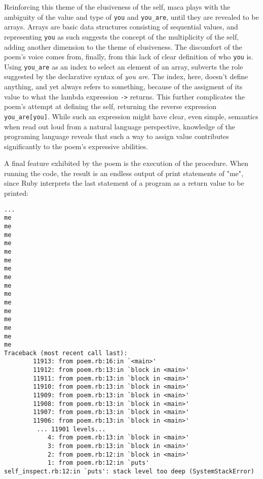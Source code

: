 \documentclass{article}
\begin{document}
Reinforcing this theme of the elusiveness of the self, maca plays with the ambiguity of the value and type of \lstinline{you} and \lstinline{you_are}, until they are revealed to be arrays. Arrays are basic data structures consisting of sequential values, and representing \lstinline{you} as such suggests the concept of the multiplicity of the self, adding another dimension to the theme of elusiveness. The discomfort of the poem's voice comes from, finally, from this lack of clear definition of who \lstinline{you} is. Using \lstinline{you_are} as an index to select an element of an array, subverts the role suggested by the declarative syntax of \emph{you are}. The index, here, doesn't define anything, and yet always refers to something, because of the assigment of its value to what the lambda expression \lstinline{->} returns. This further complicates the poem's attempt at defining the self, returning the reverse expression \lstinline{you_are[you]}. While such an expression might have clear, even simple, semantics when read out loud from a natural language perspective, knowledge of the programing language reveals that such a way to assign value contributes significantly to the poem's expressive abilities.

A final feature exhibited by the poem is the execution of the procedure. When running the code, the result is an endless output of print statements of "me", since Ruby interprets the last statement of a program as a return value to be printed:

\linespread{1.00}\selectfont
\begin{lstlisting}
...
me
me
me
me
me
me
me
me
me
me
me
me
me
me
me
me
Traceback (most recent call last):                 
        11913: from poem.rb:16:in `<main>'
        11912: from poem.rb:13:in `block in <main>'
        11911: from poem.rb:13:in `block in <main>'
        11910: from poem.rb:13:in `block in <main>'
        11909: from poem.rb:13:in `block in <main>'
        11908: from poem.rb:13:in `block in <main>'          
        11907: from poem.rb:13:in `block in <main>'
        11906: from poem.rb:13:in `block in <main>'                             
         ... 11901 levels...                                                    
            4: from poem.rb:13:in `block in <main>'                             
            3: from poem.rb:13:in `block in <main>'                             
            2: from poem.rb:12:in `block in <main>'                             
            1: from poem.rb:12:in `puts'                                        
self_inspect.rb:12:in `puts': stack level too deep (SystemStackError)  
\end{lstlisting}
\linespread{1.50}\selectfont
\end{document}
